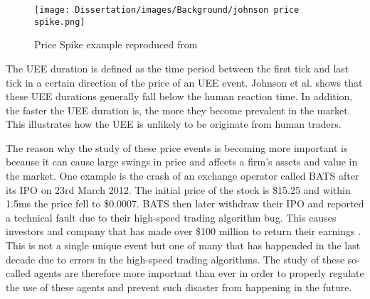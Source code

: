 \begin{figure}[h]
\texttt{[image: Dissertation/images/Background/johnson price spike.png]}
\caption{Price Spike example reproduced from \cite{Johnson}}  
\end{figure} 
\FloatBarrier

The UEE duration is defined as the time period between the first tick and last tick in a certain direction of the price of an UEE event. Johnson et al. shows that these UEE durations generally fall below the human reaction time. In addition, the faster the UEE duration is, the more they become prevalent in the market. This illustrates how the UEE is unlikely to be originate from human traders. 

The reason why the study of these price events is becoming more important is because it can cause large swings in price and affects a firm's assets and value in the market. One example is the crash of an exchange operator called BATS after its IPO on 23rd March 2012. The initial price of the stock is \$15.25 and within 1.5ms the price fell to \$0.0007. BATS then later withdraw their IPO and reported a technical fault due to their high-speed trading algorithm bug. This causes investors and company that has made over \$100 million to return their earnings \cite{BATS}. This is not a single unique event but one of many that has happended in the last decade due to errors in the high-speed trading algorithms. The study of these so-called agents are therefore more important than ever in order to properly regulate the use of these agents and prevent such disaster from happening in the future. 



